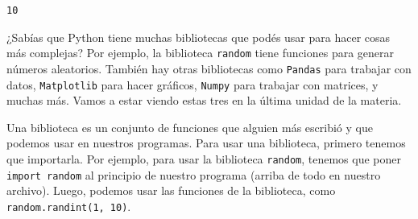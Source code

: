 \documentclass[
  letterpaper,
  DIV=11,
  numbers=noendperiod]{scrreprt}
\begin{document}
\begin{verbatim}
10
\end{verbatim}

\begin{tcolorbox}[enhanced jigsaw, arc=.35mm, toptitle=1mm, colframe=quarto-callout-note-color-frame, bottomtitle=1mm, opacitybacktitle=0.6, colbacktitle=quarto-callout-note-color!10!white, leftrule=.75mm, coltitle=black, toprule=.15mm, titlerule=0mm, title=\textcolor{quarto-callout-note-color}{\faInfo}\hspace{0.5em}{Tip: Bibliotecas}, bottomrule=.15mm, rightrule=.15mm, colback=white, breakable, opacityback=0, left=2mm]

¿Sabías que Python tiene muchas bibliotecas que podés usar para hacer
cosas más complejas? Por ejemplo, la biblioteca \texttt{random} tiene
funciones para generar números aleatorios. También hay otras bibliotecas
como \texttt{Pandas} para trabajar con datos, \texttt{Matplotlib} para
hacer gráficos, \texttt{Numpy} para trabajar con matrices, y muchas más.
Vamos a estar viendo estas tres en la última unidad de la materia.

Una biblioteca es un conjunto de funciones que alguien más escribió y
que podemos usar en nuestros programas. Para usar una biblioteca,
primero tenemos que importarla. Por ejemplo, para usar la biblioteca
\texttt{random}, tenemos que poner \texttt{import\ random} al principio
de nuestro programa (arriba de todo en nuestro archivo). Luego, podemos
usar las funciones de la biblioteca, como
\texttt{random.randint(1,\ 10)}.

\end{tcolorbox}
\end{document}
